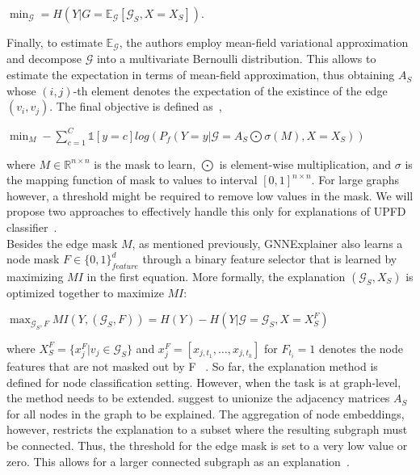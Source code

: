 \begin{center}
    $\min_{\mathcal{G}} = H(Y | G = \mathbb{E}_{\mathcal{G}} [\mathcal{G}_S, X = X_S])$.
\end{center}
Finally, to estimate $\mathbb{E}_{\mathcal{G}}$, the authors employ mean-field variational approximation and decompose $\mathcal{G}$ into a multivariate Bernoulli distribution. This allows to estimate the expectation in terms of mean-field approximation, thus obtaining $A_S$ whose $(i, j)$-th element denotes the expectation of the existince of the edge $(v_i, v_j)$. The final objective is defined as~\parencite{GNNExplainer_Ying},
\begin{center}
    $\min_M - \sum\limits_{c=1}^C \mathbb{1}[y = c] log (P_f (Y=y | \mathcal{G} = A_S \bigodot \sigma(M), X = X_S))$
\end{center}
where $M \in \mathbb{R}^{n \times n}$ is the mask to learn, $\bigodot$ is element-wise multiplication, and $\sigma$ is
the mapping function of mask to values to interval $[0, 1]^{n \times n}$. For large graphs however, a threshold might be required to remove low values in the mask. We will propose two approaches to effectively
handle this only for explanations of UPFD classifier~\parencite{GNNExplainer_Ying}.\\
Besides the edge mask $M$, as mentioned previously, GNNExplainer also learns a node mask $F \in \{0, 1\}^d_{feature}$ through a binary feature selector that is learned by maximizing $MI$ in the first equation. More formally, the explanation $(\mathcal{G}_S, X_S)$ is optimized together to maximize $MI$:
\begin{center}
    $\max_{\mathcal{G}_S, F} MI (Y, (\mathcal{G}_S, F)) = H(Y) - H(Y | \mathcal{G} = \mathcal{G}_S, X = X_S^F)$
\end{center}
where $X_S^F = \{x_j^F|v_j \in \mathcal{G}_S\}$ and $x_j^F = [x_{j, t_1}, \dots, x_{j, t_k}]$ for
$F_{t_i} = 1$ denotes the node features that are not masked out by F~\parencite{GNNExplainer_Ying} . So far, the
explanation method is defined for node classification setting. However, when the task is at graph-level, the method needs
to be extended. \cite{GNNExplainer_Ying} suggest to unionize  the adjacency matrices $A_S$ for all nodes in the graph to
be explained. The aggregation of node embeddings, however, restricts the explanation to a subset where the resulting
subgraph must be connected. Thus, the threshold for the edge mask is set to a very low value or zero. This allows for a larger connected subgraph as an explanation~\parencite{GNNExplainer_Ying}.\\


